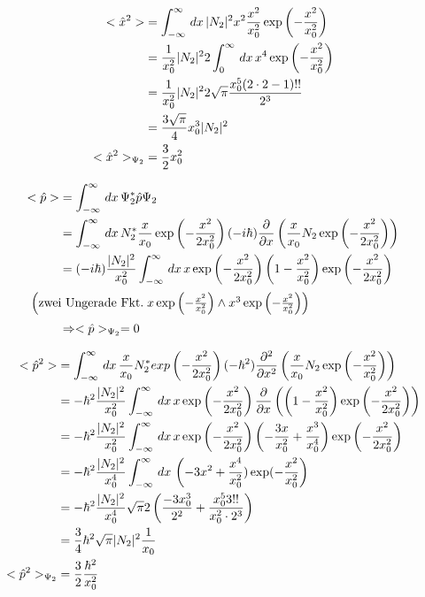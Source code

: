 \begin{align}
    <\hat x ^2> &= \int_{-\infty}^{\infty}\,dx\, \lvert N_2\rvert^2 x^2 \frac{x^2}{x_0^2} \exp\left(-\frac{x^2}{x_0^2}\right)\\
    &=\frac{1}{x_0^2} \lvert N_2\rvert^2 2 \int_0^{\infty}\,dx\, x^4 \exp\left(-\frac{x^2}{x_0^2}\right)\\
    &=\frac{1}{x_0^2} \lvert N_2\rvert^2 2\sqrt{\pi} \frac{x_0^5(2\cdot2-1)!!}{2^3}\\
    &=\frac{3\sqrt{\pi}}{4}x_0^3 \lvert N_2\rvert^2\\
    <\hat x ^2>_{\Psi _2}&= \frac{3}{2} x_0^2
\end{align}

\begin{align}
    <\hat p > &= \int_{-\infty}^{\infty}\,dx\, \Psi _2^*\hat p \Psi _2\\
    &=\int_{-\infty}^{\infty}\,dx\, N_2^* \frac{x}{x_0} \exp\left(-\frac{x^2}{2x_0^2}\right) (-i\hbar) \frac{\partial}{\partial x}\left(\frac{x}{x_0} N_2 \exp \left(-\frac{x^2}{2x_0^2}\right)\right) \\
    &=(-i\hbar) \frac{\lvert N_2\rvert^2}{x_0^2} \int_{-\infty}^{\infty} \,dx\,x\exp\left(-\frac{x^2}{2x_0^2}\right) \left(1-\frac{x^2}{x_0^2}\right)\exp\left(-\frac{x^2}{2x_0^2}\right)\\
    \intertext{
        $\left(\text{zwei Ungerade Fkt.}\; x \exp\left(-\frac{x^2}{x_0^2} \right) \wedge x^3 \exp\left(-\frac{x^2}{x_0^2} \right) \right)$
    }
    &\Rightarrow <\hat p >_{\Psi _2}=0
\end{align}

\begin{align}
    <\hat p ^2> &= \int_{-\infty}^{\infty}\,dx\, \frac{x}{x_0} N_2^* exp\left(-\frac{x^2}{2x_0^2}\right) (-\hbar^2) \frac{\partial ^2}{\partial x^2}\left(\frac{x}{x_0} N_2 \exp\left(-\frac{x^2}{x_0^2}\right) \right)\\
    &= - \hbar ^2 \frac{\lvert N_2\rvert^2}{x_0^2} \int_{-\infty}^{\infty}\,dx\, x \exp\left(-\frac{x^2}{2x_0^2}\right)\frac{\partial}{\partial x}\left(\left(1-\frac{x^2}{x_0^2}\right)\exp\left(-\frac{x^2}{2x_0^2}\right) \right)\\
    &= - \hbar ^2 \frac{\lvert N_2\rvert^2}{x_0^2} \int_{-\infty}^{\infty}\,dx\, x \exp\left(-\frac{x^2}{2x_0^2}\right)\left(\--\frac{3x}{x_0^2}+\frac{x^3}{x_0^4} \right) \exp\left(-\frac{x^2}{2x_0^2}\right)\\
    &= - \hbar^2 \frac{\lvert N_2\rvert^2}{x_0^4} \int_{-\infty}^{\infty}\,dx\, \left(-3x^2+\frac{x^4}{x_0^2})\exp(-\frac{x^2}{x_0^2}\right)\\
    &= - \hbar^2 \frac{\lvert N_2\rvert^2}{x_0^4} \sqrt{\pi} 2\left(\frac{-3x_0^3}{2^2}+\frac{x_0^5 3!!}{x_0^2\cdot 2^3}\right)\\
    &= \frac{3}{4} \hbar^2 \sqrt{\pi} \lvert N_2\rvert^2 \frac{1}{x_0}\\
    <\hat p ^2 >_{\Psi _2}&=\frac{3}{2} \frac{\hbar ^2}{x_0^2}
\end{align}

